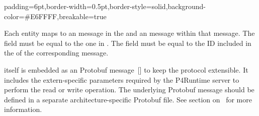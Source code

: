 \documentclass[11pt]{article}
\begin{document}
{%
\begin{mdbmargintb}{6pt}{6pt}%
\begin{mdblock}{padding=6pt,border-width=0.5pt,border-style=solid,background-color=\#E6FFFF,breakable=true}%
\begin{mdpre}%
\end{mdpre}%
\end{mdblock}%
\end{mdbmargintb}%

\noindent{}Each  entity maps to an  message in the
 and an  message within that
message. The  field must be equal to the one in
. The  field must be equal to the ID included in the
 of the corresponding  message.%

 itself is embedded as an  Protobuf message~[] to keep the
protocol extensible. It includes the extern-specific parameters required by the
P4Runtime server to perform the read or write operation. The underlying Protobuf
message should be defined in a separate architecture-specific Protobuf file. See
section on~ for more information.%

}
\end{document}
